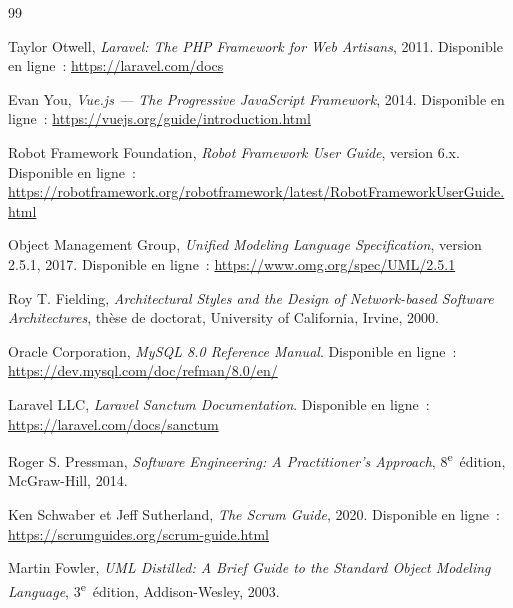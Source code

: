 \documentclass{rapportPFA}
\begin{document}
\begin{thebibliography}{99}

Taylor Otwell,
\textit{Laravel: The PHP Framework for Web Artisans}, 2011.
Disponible en ligne~: \url{https://laravel.com/docs}

Evan You,
\textit{Vue.js --- The Progressive JavaScript Framework}, 2014.
Disponible en ligne~: \url{https://vuejs.org/guide/introduction.html}

Robot Framework Foundation,
\textit{Robot Framework User Guide}, version 6.x.
Disponible en ligne~: \url{https://robotframework.org/robotframework/latest/RobotFrameworkUserGuide.html}

Object Management Group,
\textit{Unified Modeling Language Specification}, version 2.5.1, 2017.
Disponible en ligne~: \url{https://www.omg.org/spec/UML/2.5.1}

Roy T. Fielding,
\textit{Architectural Styles and the Design of Network-based Software Architectures},
thèse de doctorat, University of California, Irvine, 2000.

Oracle Corporation,
\textit{MySQL 8.0 Reference Manual}.
Disponible en ligne~: \url{https://dev.mysql.com/doc/refman/8.0/en/}

Laravel LLC,
\textit{Laravel Sanctum Documentation}.
Disponible en ligne~: \url{https://laravel.com/docs/sanctum}

Roger S. Pressman,
\textit{Software Engineering: A Practitioner's Approach},
8\textsuperscript{e}~édition, McGraw-Hill, 2014.

Ken Schwaber et Jeff Sutherland,
\textit{The Scrum Guide}, 2020.
Disponible en ligne~: \url{https://scrumguides.org/scrum-guide.html}

Martin Fowler,
\textit{UML Distilled: A Brief Guide to the Standard Object Modeling Language},
3\textsuperscript{e}~édition, Addison-Wesley, 2003.

\end{thebibliography}
\end{document}
